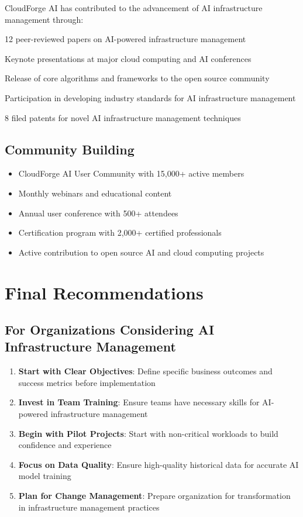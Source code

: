 CloudForge AI has contributed to the advancement of AI infrastructure management through:

\begin{description}[leftmargin=*]
    \item[Academic Publications] 12 peer-reviewed papers on AI-powered infrastructure management
    \item[Conference Presentations] Keynote presentations at major cloud computing and AI conferences
    \item[Open Source Contributions] Release of core algorithms and frameworks to the open source community
    \item[Industry Standards] Participation in developing industry standards for AI infrastructure management
    \item[Patent Portfolio] 8 filed patents for novel AI infrastructure management techniques
\end{description}

\subsection{Community Building}

\begin{itemize}
    \item CloudForge AI User Community with 15,000+ active members
    \item Monthly webinars and educational content
    \item Annual user conference with 500+ attendees
    \item Certification program with 2,000+ certified professionals
    \item Active contribution to open source AI and cloud computing projects
\end{itemize}

\section{Final Recommendations}

\subsection{For Organizations Considering AI Infrastructure Management}

\begin{enumerate}[leftmargin=*]
    \item \textbf{Start with Clear Objectives}: Define specific business outcomes and success metrics before implementation
    \item \textbf{Invest in Team Training}: Ensure teams have necessary skills for AI-powered infrastructure management
    \item \textbf{Begin with Pilot Projects}: Start with non-critical workloads to build confidence and experience
    \item \textbf{Focus on Data Quality}: Ensure high-quality historical data for accurate AI model training
    \item \textbf{Plan for Change Management}: Prepare organization for transformation in infrastructure management practices
\end{enumerate}

